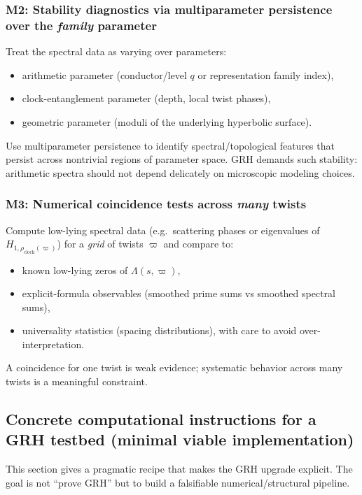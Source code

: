 \documentclass[11pt,oneside]{amsbook}
\numberwithin{equation}{section}
\theoremstyle{plain}
\theoremstyle{definition}
\theoremstyle{remark}
\begin{document}
\subsubsection*{M2: Stability diagnostics via multiparameter persistence over the \emph{family} parameter}
Treat the spectral data as varying over parameters:
\begin{itemize}
\item arithmetic parameter (conductor/level $q$ or representation family index),
\item clock-entanglement parameter (depth, local twist phases),
\item geometric parameter (moduli of the underlying hyperbolic surface).
\end{itemize}
Use multiparameter persistence to identify spectral/topological features that persist across nontrivial regions of parameter space.
GRH demands such stability: arithmetic spectra should not depend delicately on microscopic modeling choices.

\subsubsection*{M3: Numerical coincidence tests across \emph{many} twists}
Compute low-lying spectral data (e.g.\ scattering phases or eigenvalues of $H_{1,\rho_{\mathrm{clock}}(\varpi)}$) for a \emph{grid} of twists $\varpi$ and compare to:
\begin{itemize}
\item known low-lying zeros of $\Lambda(s,\varpi)$,
\item explicit-formula observables (smoothed prime sums vs smoothed spectral sums),
\item universality statistics (spacing distributions), with care to avoid over-interpretation.
\end{itemize}
A coincidence for one twist is weak evidence; systematic behavior across many twists is a meaningful constraint.

\subsection{Concrete computational instructions for a GRH testbed (minimal viable implementation)}
\label{sec:implementation_GRH}

This section gives a pragmatic recipe that makes the GRH upgrade explicit.
The goal is not ``prove GRH'' but to build a falsifiable numerical/structural pipeline.
\end{document}
